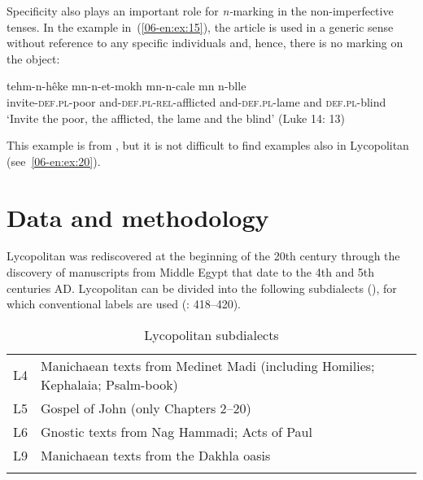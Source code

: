 \documentclass[output=paper]{LSP/langsci}
\begin{document}
Specificity also plays an important role for \textit{n-}marking in the non-imperfective tenses. In the example in~(\ref{06-en:ex:15}), the  article is used in a generic sense without reference to any specific individuals and, hence, there is no marking on the object:

\begin{exe}
\ex \label{06-en:ex:15}
\gll tehm-n-hêke 			mn-n-et-mokh 		mn-n-cale  mn 		n-blle\\
	invite-\textsc{def.pl-}poor and-\textsc{def.pl-rel-}afflicted and-\textsc{def.pl-}lame  and \textsc{def.pl-}blind \\
\glt ‘Invite the poor, the afflicted, the lame and the blind’ (Luke 14: 13)
\end{exe}

This example is from , but it is not difficult to find examples also in Lycopolitan  (see~\ref{06-en:ex:20}). 

\section{Data and methodology}
\label{06-en-sec:3}

Lycopolitan  \citep{Nagel1991Lycopolitan} was rediscovered at the beginning of the 20th century through the discovery of manuscripts from Middle Egypt that date to the 4th and 5th centuries AD. Lycopolitan can be divided into the following subdialects (), for which conventional labels are used (\cf \citealt{Kasser2006Aspe}: 418–420). 

\begin{table}
\begin{tabularx}{\textwidth}{lQ}
\lsptoprule

L4 & Manichaean texts from Medinet Madi (including Homilies; Kephalaia; Psalm-book)\footnotemark{}\\
L5 & Gospel of John (only Chapters 2–20)\\
L6 & Gnostic texts from Nag Hammadi; Acts of Paul \\
L9 & Manichaean texts from the Dakhla oasis\\
\lspbottomrule
\end{tabularx}
\caption{Lycopolitan subdialects}\label{06-en-tab:2}
\end{table}

\end{document}
